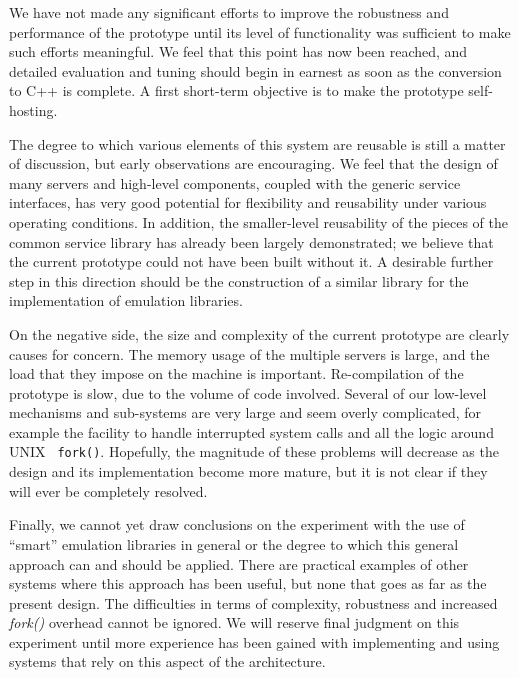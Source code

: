 We have not made any significant efforts to improve the robustness and
performance of the prototype until its level of functionality was
sufficient to make such efforts meaningful.  We feel that this point
has now been reached, and detailed evaluation and tuning should begin
in earnest as soon as the conversion to C++ is complete.  A first
short-term objective is to make the prototype self-hosting.


The degree to which various elements of this system are reusable is
still a matter of discussion, but early observations are encouraging.
We feel that the design of many servers and high-level components,
coupled with the generic service interfaces, has very good potential
for flexibility and reusability under various operating conditions. In
addition, the smaller-level reusability of the pieces of the common
service library has already been largely demonstrated; we believe that
the current prototype could not have been built without it. A
desirable further step in this direction should be the construction of
a similar library for the implementation of emulation libraries.

On the negative side, the size and complexity of the current prototype
are clearly causes for concern. The memory usage of the multiple
servers is large, and the load that they impose on the machine is
important.  Re-compilation of the prototype is slow, due to the volume
of code involved. Several of our low-level mechanisms and sub-systems
are very large and seem overly complicated, for example the facility
to handle interrupted system calls and all the logic around UNIX {\tt
fork()}.  Hopefully, the magnitude of these problems will decrease as
the design and its implementation become more mature, but it is not
clear if they will ever be completely resolved.

Finally, we cannot yet draw conclusions on the experiment with the use
of ``smart'' emulation libraries in general or the degree to which
this general approach can and should be applied.  There are practical
examples of other systems where this approach has been
useful\cite{GOLUB90}, but none that goes as far as the present design.
The difficulties in terms of complexity, robustness and increased {\em
fork()} overhead cannot be ignored. We will reserve final judgment on
this experiment until more experience has been gained with
implementing and using systems that rely on this aspect of the
architecture.


